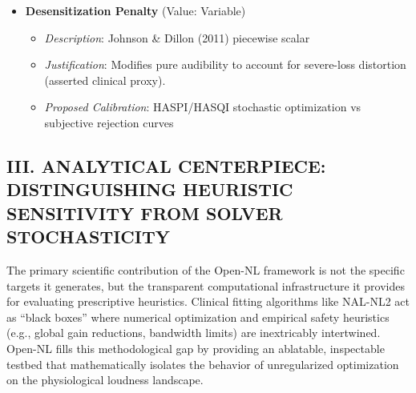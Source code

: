 \documentclass[
  12pt,
]{article}
\providecommand{\tightlist}{%
  \setlength{\itemsep}{0pt}\setlength{\parskip}{0pt}}
\begin{document}
\begin{itemize}
  \begin{itemize}
  \tightlist
  \item
    \emph{Description}: Soft penalty on emergent sensorineural CR
  \item
    \emph{Justification}: \textbf{Strong empirical support}: Anchored in
    literature (Souza, 2002) demonstrating speech degradation for CR
    \(> 3.0:1\). By enforcing this penalty alongside a strict
    post-optimization clamp, Open-NL successfully constrains emergent
    multi-level input/output mapping to empirically safe limits.
  \item
    \emph{Proposed Calibration}: Robust existing empirical literature;
    formalizing hard absolute architectural bounds
  \end{itemize}
\item
  \textbf{Desensitization Penalty} (Value: Variable)

  \begin{itemize}
  \tightlist
  \item
    \emph{Description}: Johnson \& Dillon (2011) piecewise scalar
  \item
    \emph{Justification}: Modifies pure audibility to account for
    severe-loss distortion (asserted clinical proxy).
  \item
    \emph{Proposed Calibration}: HASPI/HASQI stochastic optimization vs
    subjective rejection curves
  \end{itemize}
\end{itemize}

\subsection{III. ANALYTICAL CENTERPIECE: DISTINGUISHING HEURISTIC
SENSITIVITY FROM SOLVER
STOCHASTICITY}\label{iii.-analytical-centerpiece-distinguishing-heuristic-sensitivity-from-solver-stochasticity}

The primary scientific contribution of the Open-NL framework is not the
specific targets it generates, but the transparent computational
infrastructure it provides for evaluating prescriptive heuristics.
Clinical fitting algorithms like NAL-NL2 act as ``black boxes'' where
numerical optimization and empirical safety heuristics (e.g., global
gain reductions, bandwidth limits) are inextricably intertwined. Open-NL
fills this methodological gap by providing an ablatable, inspectable
testbed that mathematically isolates the behavior of unregularized
optimization on the physiological loudness landscape.
\end{document}
